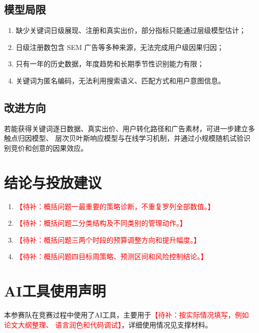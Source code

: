 \documentclass[UTF8,a4paper,zihao=-4]{ctexart}
\newcommand{\placeholder}[1]{\textcolor{red}{【待补：#1】}}
\begin{document}
\subsection{模型局限}

\begin{enumerate}
  \item 缺少关键词日级展现、注册和真实出价，部分指标只能通过层级模型估计；
  \item 日级注册数包含 SEM 广告等多种来源，无法完成用户级因果归因；
  \item 只有一年的历史数据，年度趋势和长期季节性识别能力有限；
  \item 关键词为匿名编码，无法利用搜索语义、匹配方式和用户意图信息。
\end{enumerate}

\subsection{改进方向}

若能获得关键词逐日数据、真实出价、用户转化路径和广告素材，可进一步建立多触点归因模型、
层次贝叶斯响应模型与在线学习机制，并通过小规模随机试验识别竞价和创意的因果效应。

\section{结论与投放建议}

\begin{enumerate}
  \item \placeholder{概括问题一最重要的策略诊断，不重复罗列全部数值。}
  \item \placeholder{概括问题二分类结构及不同类别的管理动作。}
  \item \placeholder{概括问题三两个时段的预算调整方向和提升幅度。}
  \item \placeholder{概括问题四目标周策略、预测区间和风险控制结论。}
\end{enumerate}

\section*{AI工具使用声明}

本参赛队在竞赛过程中使用了AI工具，主要用于\placeholder{按实际情况填写，例如论文大纲整理、
语言润色和代码调试}，详细使用情况见支撑材料。
\end{document}
